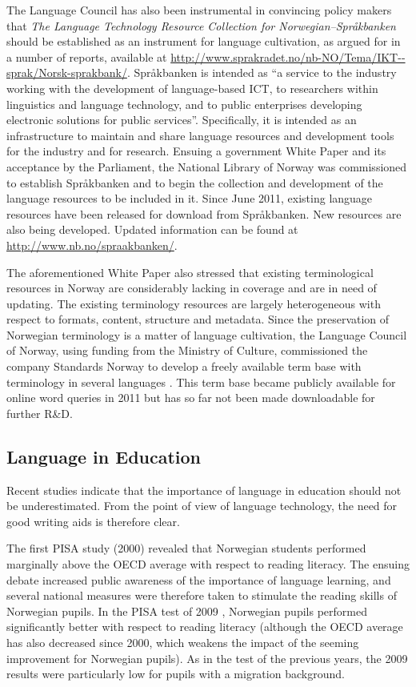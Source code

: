 \begin{multicols}{2}
The Language Council has also been instrumental in convincing policy makers that \textit{The Language Technology Resource Collection for Norwegian--Språkbanken} should be established as an instrument for language cultivation, as argued for in a number of reports, available at \url{http://www.sprakradet.no/nb-NO/Tema/IKT--sprak/Norsk-sprakbank/}.
Språkbanken is intended as “a service to the industry working with the development of language-based ICT, to researchers within linguistics and language technology, and to public enterprises developing electronic solutions for public services”. 
Specifically, it is intended as an infrastructure to maintain and share language resources and development tools for the industry and for research. 
Ensuing a government White Paper \cite{stm35:2008} and its acceptance by the Parliament, the National Library of Norway was commissioned to establish Språkbanken and to begin the collection and development of the language resources to be included in it.
Since June 2011, existing language resources have been released for download from Språkbanken.
New resources are also being developed. 
Updated information can be found at \url{http://www.nb.no/spraakbanken/}.


The aforementioned White Paper also stressed that existing terminological resources in Norway are considerably lacking in coverage and are in need of updating. 
The existing terminology resources are largely heterogeneous with respect to formats, content, structure and metadata. 
Since the preservation of Norwegian terminology is a matter of language cultivation, the Language Council of Norway, using funding from the Ministry of Culture, commissioned the company Standards Norway to develop a freely available term base with terminology in several languages \cite{drosdal2010}.
This term base became publicly available for online word queries in 2011 but has so far not been made downloadable for further R\&D.

\subsection{Language in Education}

Recent studies indicate that the importance of language in education should not be underestimated. 
From the point of view of language technology, the need for good writing aids is therefore clear.


The first PISA study (2000) revealed that Norwegian students performed marginally above the OECD average with respect to reading literacy. 
The ensuing debate increased public awareness of the importance of language learning, and several national measures were therefore taken to stimulate the reading skills of Norwegian pupils. 
In the PISA test of 2009 \cite{pisa2009eng}, Norwegian pupils performed significantly better with respect to reading literacy (although the OECD average has also decreased since 2000, which weakens the impact of the seeming improvement for Norwegian pupils). 
As in the test of the previous years, the 2009 results were particularly low for pupils with a migration background. 


\end{multicols}
